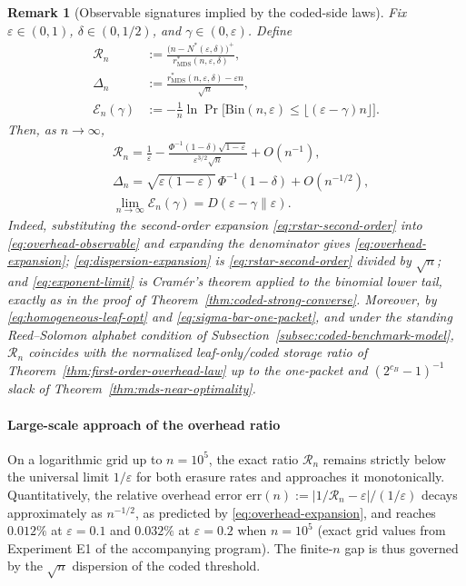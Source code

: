 \documentclass[journal]{IEEEtran}
\newtheorem{remark}{Remark}[section]
\numberwithin{equation}{section}
\begin{document}
\begin{remark}[Observable signatures implied by the coded-side laws]
\label{rem:coded-observables}
Fix \(\varepsilon\in(0,1)\), \(\delta\in(0,1/2)\), and
\(\gamma\in(0,\varepsilon)\).  Define
\begin{align}
  \mathcal R_n
  &:=
  \frac{\bigl(n-N^*(\varepsilon,\delta)\bigr)^+}
       {r_{\mathrm{MDS}}^*(n,\varepsilon,\delta)},
\label{eq:overhead-observable}\\
  \Delta_n
  &:=
  \frac{r_{\mathrm{MDS}}^*(n,\varepsilon,\delta)-\varepsilon n}
       {\sqrt n},
\label{eq:dispersion-observable}\\
  \mathcal E_n(\gamma)
  &:=
  -\frac{1}{n}\ln
  \Pr\!\bigl[
    \mathrm{Bin}(n,\varepsilon)
    \le
    \lfloor(\varepsilon-\gamma)n\rfloor
  \bigr].
\label{eq:exponent-observable}
\end{align}
Then, as \(n\to\infty\),
\begin{align}
  &\mathcal R_n
  =
  \frac{1}{\varepsilon}
  -
  \frac{\Phi^{-1}(1-\delta)\sqrt{1-\varepsilon}}
       {\varepsilon^{3/2}\sqrt n}
  +
  O\!\left(n^{-1}\right),
\label{eq:overhead-expansion}\\
  &\Delta_n
  =
  \sqrt{\varepsilon(1-\varepsilon)}\,\Phi^{-1}(1-\delta)
  +
  O\!\left(n^{-1/2}\right),
\label{eq:dispersion-expansion}\\
  &\lim_{n\to\infty}\mathcal E_n(\gamma)
  =
  D(\varepsilon-\gamma\|\varepsilon).
\label{eq:exponent-limit}
\end{align}
Indeed, substituting the second-order expansion
\eqref{eq:rstar-second-order} into \eqref{eq:overhead-observable} and
expanding the denominator gives \eqref{eq:overhead-expansion};
\eqref{eq:dispersion-expansion} is \eqref{eq:rstar-second-order} divided by
\(\sqrt n\); and \eqref{eq:exponent-limit} is Cram\'er's theorem applied to
the binomial lower tail, exactly as in the proof of
Theorem~\ref{thm:coded-strong-converse}.  Moreover, by
\eqref{eq:homogeneous-leaf-opt} and \eqref{eq:sigma-bar-one-packet}, and
under the standing Reed--Solomon alphabet condition of
Subsection~\ref{subsec:coded-benchmark-model}, \(\mathcal R_n\) coincides
with the normalized leaf-only/coded storage ratio of
Theorem~\ref{thm:first-order-overhead-law} up to the one-packet and
\((2^{c_B}-1)^{-1}\) slack of Theorem~\ref{thm:mds-near-optimality}.
\end{remark}

\paragraph*{Large-scale approach of the overhead ratio}
On a logarithmic grid up to \(n=10^{5}\), the exact ratio
\(\mathcal R_n\) remains strictly below the universal limit
\(1/\varepsilon\) for both erasure rates and approaches it monotonically.
Quantitatively, the relative overhead error
\(\mathrm{err}(n):=|1/\mathcal R_n-\varepsilon|/(1/\varepsilon)\)
decays approximately as \(n^{-1/2}\), as predicted by
\eqref{eq:overhead-expansion}, and reaches \(0.012\%\) at
\(\varepsilon=0.1\) and \(0.032\%\) at \(\varepsilon=0.2\) when
\(n=10^{5}\) (exact grid values from Experiment E1 of the accompanying
program).  The finite-\(n\) gap is thus governed by the \(\sqrt n\)
dispersion of the coded threshold.
\end{document}
